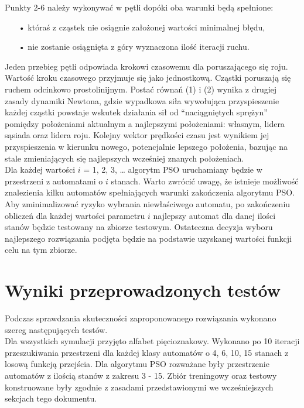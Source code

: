 \documentclass[runningheads,a4paper]{llncs}
\begin{document}
Punkty 2-6 należy wykonywać w pętli dopóki oba warunki będą spełnione:

\begin{itemize}
\item[•] któraś z cząstek nie osiągnie założonej wartości minimalnej błędu,
\item[•] nie zostanie osiągnięta z góry wyznaczona ilość iteracji ruchu.
\end{itemize}

Jeden przebieg pętli odpowiada krokowi czasowemu dla poruszającego się roju. Wartość kroku czasowego przyjmuje się jako jednostkową.
Cząstki poruszają się ruchem odcinkowo prostolinijnym. Postać równań (1) i (2) wynika z drugiej zasady dynamiki Newtona, gdzie wypadkowa siła wywołująca przyspieszenie każdej cząstki powstaje wskutek działania sił od “naciągniętych sprężyn” pomiędzy położeniami aktualnym a najlepszymi położeniami: własnym, lidera sąsiada oraz lidera roju. Kolejny wektor prędkości czasu jest wynikiem jej przyspieszenia w kierunku nowego, potencjalnie lepszego położenia, bazując na stale zmieniających się najlepszych wcześniej znanych położeniach.\\

Dla każdej wartości $i$ = 1, 2, 3, …  algorytm PSO uruchamiany będzie w przestrzeni z automatami o $i$ stanach. Warto zwrócić uwagę, że istnieje możliwość znalezienia kilku automatów spełniających warunki zakończenia algorytmu PSO. Aby zminimalizować ryzyko wybrania niewłaściwego automatu, po zakończeniu obliczeń dla każdej wartości parametru $i$ najlepszy automat dla danej ilości stanów będzie testowany na zbiorze testowym. Ostateczna decyzja wyboru najlepszego rozwiązania podjęta będzie na podstawie uzyskanej wartości funkcji celu na tym zbiorze.

\newpage

\section{Wyniki przeprowadzonych testów}

Podczas sprawdzania skuteczności zaproponowanego rozwiązania wykonano szereg następujących testów. \\

Dla wszystkich symulacji przyjęto alfabet pięcioznakowy. Wykonano po 10 iteracji przeszukiwania przestrzeni dla każdej klasy automatów o 4, 6, 10, 15 stanach z losową funkcją przejścia. Dla algorytmu PSO rozważane były przestrzenie automatów z ilością stanów z zakresu 3 - 15. Zbiór treningowy oraz testowy konstruowane były zgodnie z zasadami przedstawionymi we wcześniejszych sekcjach tego dokumentu. \\
\end{document}
